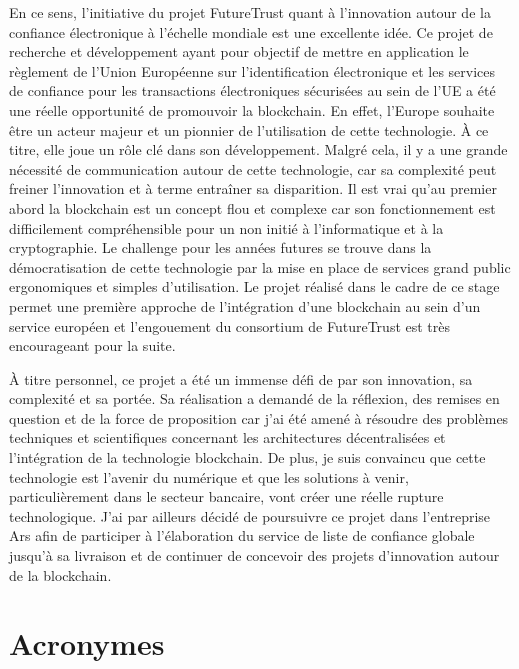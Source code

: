 \documentclass{tnreport}
\begin{document}
En ce sens, l’initiative du projet FutureTrust quant à l'innovation autour de la confiance électronique à l'échelle mondiale est une excellente idée. 
Ce projet de recherche et développement ayant pour objectif de mettre en application le règlement de l'Union Européenne sur l'identification électronique et les services de confiance pour les transactions électroniques sécurisées au sein de l'UE a été une réelle opportunité de promouvoir la blockchain.
En effet, l'Europe souhaite être un acteur majeur et un pionnier de l'utilisation de cette technologie. À ce titre, elle joue un rôle clé dans son développement.
Malgré cela, il y a une grande nécessité de communication autour de cette technologie, car sa complexité peut freiner l'innovation et à terme entraîner sa disparition.
Il est vrai qu'au premier abord la blockchain est un concept flou et complexe car son fonctionnement est difficilement compréhensible pour un non initié à l'informatique et à la cryptographie.
Le challenge pour les années futures se trouve dans la démocratisation de cette technologie par la mise en place de services grand public ergonomiques et simples d'utilisation.
Le projet réalisé dans le cadre de ce stage permet une première approche de l'intégration d'une blockchain au sein d'un service européen et l'engouement du consortium de FutureTrust est très encourageant pour la suite.

À titre personnel, ce projet a été un immense défi de par son innovation, sa complexité et sa portée. Sa réalisation a demandé de la réflexion, des remises en question et de la force de proposition car j'ai été amené à résoudre des problèmes techniques et scientifiques concernant les architectures décentralisées et l'intégration de la technologie blockchain.
De plus, je suis convaincu que cette technologie est l’avenir du numérique et
que les solutions à venir, particulièrement dans le secteur bancaire, vont créer une réelle rupture technologique.
J’ai par ailleurs décidé de poursuivre ce projet dans l'entreprise Ar{\texteta}s afin de participer à l'élaboration du service de liste de confiance globale jusqu'à sa livraison et de continuer de concevoir des projets d'innovation autour de la blockchain.

\cleardoublepage
\renewcommand{\tocbibname}{Bibliographie / Webographie}


\listoffigures

\lstlistoflistings

\chapter*{Acronymes}
\end{document}
